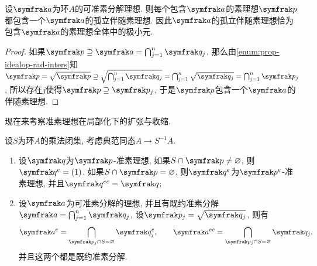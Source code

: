 \begin{proposition}\label{prop:isolatedprime}
  设$\ideal{a}$为环$A$的可准素分解理想. 则每个包含$\ideal{a}$的素理想$\ideal{p}$都包含一个$\ideal{a}$的孤立伴随素理想. 因此$\ideal{a}$的孤立伴随素理想恰为包含$\ideal{a}$的素理想全体中的极小元.
\end{proposition}

\begin{proof}
  如果$\ideal{p}\supseteq\ideal{a}=\bigcap_{j=1}^n\ideal{q}_j$, 那么由\ref{enum:prop-idealop-rad-inters}知$\ideal{p}=\sqrt{\ideal{p}}\supseteq\sqrt{\bigcap_{j=1}^n\ideal{q}_j}=\bigcap_{j=1}^n\sqrt{\ideal{q}_j}=\bigcap_{j=1}^n\ideal{p}_j$, 所以存在$j$使得$\ideal{p}\supseteq\ideal{p}_j$, 于是$\ideal{p}$包含一个$\ideal{a}$的伴随素理想.
\end{proof}

现在来考察准素理想在局部化下的扩张与收缩.

\begin{proposition}\label{prop:primlocal}设$S$为环$A$的乘法闭集, 考虑典范同态$A\to S^{-1}A$.
  \begin{enumerate}
    \item\label{enum:prop-primlocal-exten} 设$\ideal{q}$为$\ideal{p}$-准素理想, 如果$S\cap\ideal{p}\neq\varnothing$, 则$\ideal{q}^e=(1)$. 如果$S\cap\ideal{p}=\varnothing$, 则$\ideal{q}^e$为$\ideal{p}^e$-准素理想, 并且$\ideal{q}^{ec}=\ideal{q}$;
    \item\label{enum:prop-primlocal-decom} 设$\ideal{a}$为可准素分解的理想, 并且有既约准素分解$\ideal{a}=\bigcap_{j=1}^n\ideal{q}_j$, 设$\ideal{p}_j=\sqrt{\ideal{q}_j}$, 则有
    \begin{equation*}
      \ideal{a}^{e}=\bigcap_{\ideal{p}_j\cap S=\varnothing}\ideal{q}_j^e,
      \qquad \ideal{a}^{ec}=\bigcap_{\ideal{p}_j\cap S=\varnothing}\ideal{q}_j,
    \end{equation*}
    并且这两个都是既约准素分解.
  \end{enumerate}
\end{proposition}

